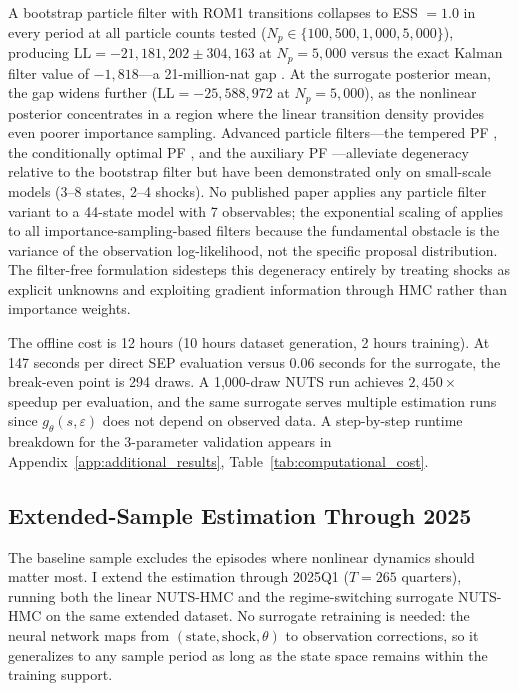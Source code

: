 \documentclass[12pt]{article}
\theoremstyle{plain}
\theoremstyle{definition}
\theoremstyle{remark}
\begin{document}
A bootstrap particle filter \citep{gordon1993novel} with ROM1 transitions collapses to ESS $= 1.0$ in every period at all particle counts tested ($N_p \in \{100, 500, 1{,}000, 5{,}000\}$), producing $\text{LL} = -21{,}181{,}202 \pm 304{,}163$ at $N_p = 5{,}000$ versus the exact Kalman filter value of $-1{,}818$---a 21-million-nat gap \citep[consistent with the degeneracy documented by][]{herbst2019tempered,cubaborda2019likelihood}. At the surrogate posterior mean, the gap widens further ($\text{LL} = -25{,}588{,}972$ at $N_p = 5{,}000$), as the nonlinear posterior concentrates in a region where the linear transition density provides even poorer importance sampling. Advanced particle filters---the tempered PF \citep{herbst2019tempered}, the conditionally optimal PF \citep{aruoba2021piecewise}, and the auxiliary PF \citep{pitt1999filtering}---alleviate degeneracy relative to the bootstrap filter but have been demonstrated only on small-scale models (3--8 states, 2--4 shocks). No published paper applies any particle filter variant to a 44-state model with 7 observables; the exponential scaling of \citet{snyder2008obstacles} applies to all importance-sampling-based filters because the fundamental obstacle is the variance of the observation log-likelihood, not the specific proposal distribution. The filter-free formulation sidesteps this degeneracy entirely by treating shocks as explicit unknowns and exploiting gradient information through HMC rather than importance weights.

The offline cost is 12 hours (10 hours dataset generation, 2 hours training). At 147 seconds per direct SEP evaluation versus 0.06 seconds for the surrogate, the break-even point is 294 draws. A 1,000-draw NUTS run achieves $2{,}450\times$ speedup per evaluation, and the same surrogate serves multiple estimation runs since $g_\theta(s, \varepsilon)$ does not depend on observed data. A step-by-step runtime breakdown for the 3-parameter validation appears in Appendix~\ref{app:additional_results}, Table~\ref{tab:computational_cost}.


\subsection{Extended-Sample Estimation Through 2025}
\label{subsec:extended_sample}

The baseline sample excludes the episodes where nonlinear dynamics should matter most. I extend the estimation through 2025Q1 ($T = 265$ quarters), running both the linear NUTS-HMC and the regime-switching surrogate NUTS-HMC on the same extended dataset. No surrogate retraining is needed: the neural network maps from $(\text{state}, \text{shock}, \theta)$ to observation corrections, so it generalizes to any sample period as long as the state space remains within the training support.
\end{document}
